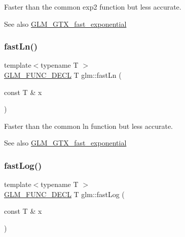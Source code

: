 Faster than the common exp2 function but less accurate. \begin{DoxySeeAlso}{See also}
\hyperlink{group__gtx__fast__exponential}{G\+L\+M\+\_\+\+G\+T\+X\+\_\+fast\+\_\+exponential} 
\end{DoxySeeAlso}
\mbox{\label{group__gtx__fast__exponential_ga8f27c4779039f88ae790a9a69be01630}} 
\subsubsection{\texorpdfstring{fast\+Ln()}{fastLn()}}
{\footnotesize\ttfamily template$<$typename T $>$ \\
\hyperlink{setup_8hpp_ab2d052de21a70539923e9bcbf6e83a51}{G\+L\+M\+\_\+\+F\+U\+N\+C\+\_\+\+D\+E\+CL} T glm\+::fast\+Ln (\begin{DoxyParamCaption}\item[{const T \&}]{x }\end{DoxyParamCaption})}

Faster than the common ln function but less accurate. \begin{DoxySeeAlso}{See also}
\hyperlink{group__gtx__fast__exponential}{G\+L\+M\+\_\+\+G\+T\+X\+\_\+fast\+\_\+exponential} 
\end{DoxySeeAlso}
\mbox{\label{group__gtx__fast__exponential_ga0130dd03ca124c27dc2094de7ee47e8a}} 
\subsubsection{\texorpdfstring{fast\+Log()}{fastLog()}}
{\footnotesize\ttfamily template$<$typename T $>$ \\
\hyperlink{setup_8hpp_ab2d052de21a70539923e9bcbf6e83a51}{G\+L\+M\+\_\+\+F\+U\+N\+C\+\_\+\+D\+E\+CL} T glm\+::fast\+Log (\begin{DoxyParamCaption}\item[{const T \&}]{x }\end{DoxyParamCaption})}

